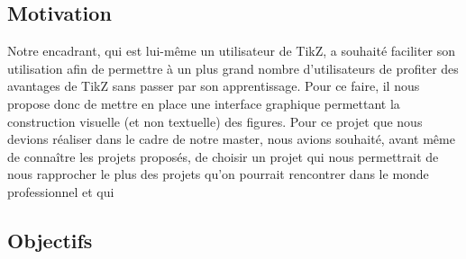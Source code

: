 \documentclass[a4paper]{report}
\begin{document}
  \subsection{Motivation}
  Notre encadrant, qui est lui-même un utilisateur de TikZ, a souhaité faciliter son utilisation afin de permettre à un plus grand nombre d'utilisateurs de profiter des avantages de TikZ sans passer par son apprentissage. Pour ce faire, il nous propose donc de mettre en place une interface graphique permettant la construction  visuelle (et non textuelle) des figures.
  \newline
  Pour ce projet que nous devions réaliser dans le cadre de notre master, nous avions souhaité, avant même de 
connaître les projets proposés, de choisir un projet qui nous permettrait de nous rapprocher le plus des projets qu'on pourrait rencontrer dans le monde professionnel et qui 
  \subsection{Objectifs}

   
\end{document}
